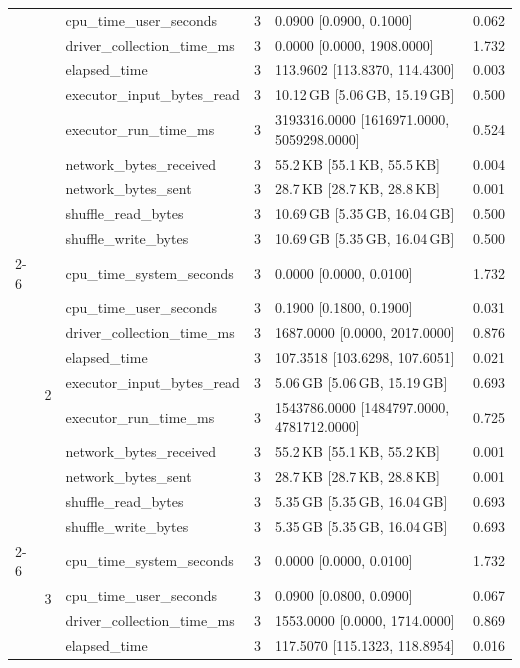 \begin{tabular}{lllrll}
 &  & cpu_time_user_seconds & 3 & 0.0900 [0.0900, 0.1000] & 0.062 \\
 &  & driver_collection_time_ms & 3 & 0.0000 [0.0000, 1908.0000] & 1.732 \\
 &  & elapsed_time & 3 & 113.9602 [113.8370, 114.4300] & 0.003 \\
 &  & executor_input_bytes_read & 3 & 10.12\,GB [5.06\,GB, 15.19\,GB] & 0.500 \\
 &  & executor_run_time_ms & 3 & 3193316.0000 [1616971.0000, 5059298.0000] & 0.524 \\
 &  & network_bytes_received & 3 & 55.2\,KB [55.1\,KB, 55.5\,KB] & 0.004 \\
 &  & network_bytes_sent & 3 & 28.7\,KB [28.7\,KB, 28.8\,KB] & 0.001 \\
 &  & shuffle_read_bytes & 3 & 10.69\,GB [5.35\,GB, 16.04\,GB] & 0.500 \\
 &  & shuffle_write_bytes & 3 & 10.69\,GB [5.35\,GB, 16.04\,GB] & 0.500 \\
\cline{2-6}
 & \multirow[t]{10}{*}{2} & cpu_time_system_seconds & 3 & 0.0000 [0.0000, 0.0100] & 1.732 \\
 &  & cpu_time_user_seconds & 3 & 0.1900 [0.1800, 0.1900] & 0.031 \\
 &  & driver_collection_time_ms & 3 & 1687.0000 [0.0000, 2017.0000] & 0.876 \\
 &  & elapsed_time & 3 & 107.3518 [103.6298, 107.6051] & 0.021 \\
 &  & executor_input_bytes_read & 3 & 5.06\,GB [5.06\,GB, 15.19\,GB] & 0.693 \\
 &  & executor_run_time_ms & 3 & 1543786.0000 [1484797.0000, 4781712.0000] & 0.725 \\
 &  & network_bytes_received & 3 & 55.2\,KB [55.1\,KB, 55.2\,KB] & 0.001 \\
 &  & network_bytes_sent & 3 & 28.7\,KB [28.7\,KB, 28.8\,KB] & 0.001 \\
 &  & shuffle_read_bytes & 3 & 5.35\,GB [5.35\,GB, 16.04\,GB] & 0.693 \\
 &  & shuffle_write_bytes & 3 & 5.35\,GB [5.35\,GB, 16.04\,GB] & 0.693 \\
\cline{2-6}
 & \multirow[t]{10}{*}{3} & cpu_time_system_seconds & 3 & 0.0000 [0.0000, 0.0100] & 1.732 \\
 &  & cpu_time_user_seconds & 3 & 0.0900 [0.0800, 0.0900] & 0.067 \\
 &  & driver_collection_time_ms & 3 & 1553.0000 [0.0000, 1714.0000] & 0.869 \\
 &  & elapsed_time & 3 & 117.5070 [115.1323, 118.8954] & 0.016 \\

\end{tabular}
